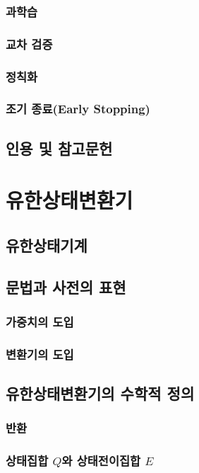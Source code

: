 \documentclass{book}
\begin{document}
\subsection{과학습}
\subsection{교차 검증}
\subsection{정칙화}
\subsection{조기 종료(Early Stopping)}
\section*{인용 및 참고문헌}

\chapter{유한상태변환기}
\section{유한상태기계}
\section{문법과 사전의 표현}
\subsection{가중치의 도입}
\subsection{변환기의 도입}
\section{유한상태변환기의 수학적 정의}
\subsection{반환}
\subsection{상태집합 \begin{math}Q\end{math}와 상태전이집합 \begin{math}E\end{math}}
\end{document}

